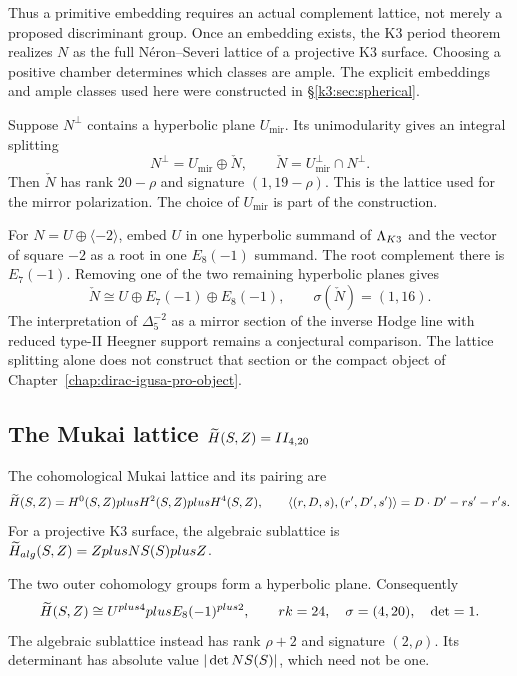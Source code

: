 Thus a primitive embedding requires an actual complement lattice,
not merely a proposed discriminant group.  Once an embedding exists,
the K3 period theorem realizes $N$ as the full N\'eron--Severi
lattice of a projective K3 surface.  Choosing a positive chamber
determines which classes are ample.  The explicit embeddings and
ample classes used here were constructed in
\S\ref{k3:sec:spherical}.

\begin{remark}
\label{rem:mirror-lattice-convention}
Suppose $N^\perp$ contains a hyperbolic plane $U_{\mathrm{mir}}$.
Its unimodularity gives an integral splitting
\[
N^\perp=U_{\mathrm{mir}}\oplus\check N,
\qquad \check N=U_{\mathrm{mir}}^\perp\cap N^\perp.
\]
Then $\check N$ has rank $20-\rho$ and signature $(1,19-\rho)$.
This is the lattice used for the mirror polarization.  The choice of
$U_{\mathrm{mir}}$ is part of the construction.

For $N=U\oplus\langle-2\rangle$, embed $U$ in one hyperbolic
summand of $\Lambda_{K3}$ and the vector of square $-2$ as a root in one
$E_8(-1)$ summand.  The root complement there is $E_7(-1)$.  Removing
one of the two remaining hyperbolic planes gives
\[
\check N\cong U\oplus E_7(-1)\oplus E_8(-1),
\qquad \sigma(\check N)=(1,16).
\]
The interpretation of $\Delta_5^{-2}$ as a mirror section of the
inverse Hodge line with reduced type-II Heegner support remains a
conjectural comparison.  The lattice splitting alone does not
construct that section or the compact object of
Chapter~\ref{chap:dirac-igusa-pro-object}.
\end{remark}

\subsection{The Mukai lattice $\widetilde H(S,Z)=II_{4,20}$}
\label{app:lattice-Mukai}

\begin{definition}
\label{def:mukai-lattice-appA}
The cohomological Mukai lattice and its pairing are
\[
\widetilde H(S,Z)=H^0(S,Z)plus H^2(S,Z)plus H^4(S,Z),
\qquad
\langle(r,D,s),(r',D',s')\rangle=D\cdot D'-rs'-r's.
\]
For a projective K3 surface, the algebraic sublattice is
$\widetilde H_{alg}(S,Z)=ZplusNS(S)plusZ$.
\end{definition}

\begin{verification}
\label{ver:mukai-invariants}
The two outer cohomology groups form a hyperbolic plane.  Consequently
\[
\widetilde H(S,Z)\cong U^{plus4}plus E_8(-1)^{plus2},
\qquad
rk=24,\quad \sigma=(4,20),\quad \det=1.
\]
The algebraic sublattice instead has rank $\rho+2$ and signature
$(2,\rho)$.  Its determinant has absolute value $|\det NS(S)|$,
which need not be one.
\end{verification}

